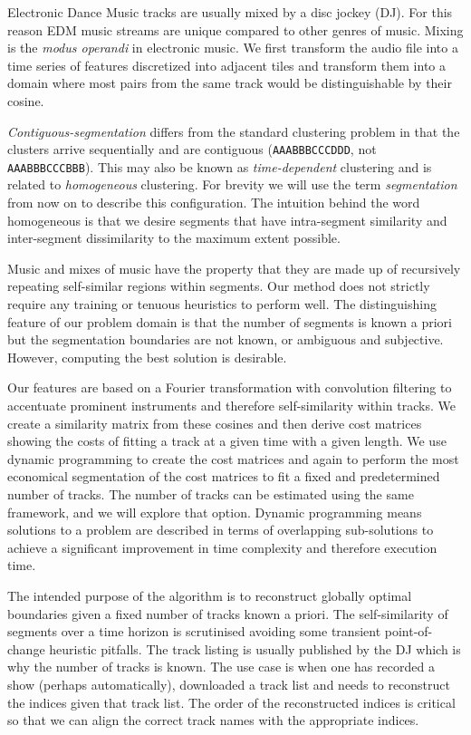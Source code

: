 \documentclass[twocolumn]{article}
\begin{document}
	Electronic Dance Music tracks are usually mixed by a disc jockey (DJ). For this reason EDM music streams are unique compared to other genres of music. Mixing is the \textit{modus operandi} in electronic music. We first transform the audio file into a time series of features discretized into adjacent tiles and transform them into a domain where most pairs from the same track would be distinguishable by their cosine. 
	
	\textit{Contiguous-segmentation} differs from the standard clustering problem in that the clusters arrive sequentially and are contiguous (\texttt{AAABBBCCCDDD}, not \texttt{AAABBBCCCBBB}). This may also be known as \textit{time-dependent} clustering and is related to \textit{homogeneous} clustering. For brevity we will use the term \textit{segmentation} from now on to describe this configuration. The intuition behind the word homogeneous is that we desire segments that have intra-segment similarity and inter-segment dissimilarity to the maximum extent possible. 
	
	Music and mixes of music have the property that they are made up of recursively repeating self-similar regions within segments. Our method does not strictly require any training or tenuous heuristics to perform well. The distinguishing feature of our problem domain is that the number of segments is known a priori but the segmentation boundaries are not known, or ambiguous and subjective. However, computing the best solution is desirable.
	
	Our features are based on a Fourier transformation with convolution filtering to accentuate prominent instruments and therefore self-similarity within tracks. We create a similarity matrix from these cosines and then derive cost matrices showing the costs of fitting a track at a given time with a given length. We use dynamic programming to create the cost matrices and again to perform the most economical segmentation of the cost matrices to fit a fixed and predetermined number of tracks. The number of tracks can be estimated using the same framework, and we will explore that option. Dynamic programming means solutions to a problem are described in terms of overlapping sub-solutions to achieve a significant improvement in time complexity and therefore execution time. 
	
	The intended purpose of the algorithm is to reconstruct globally optimal boundaries given a fixed number of tracks known a priori. The self-similarity of segments over a time horizon is scrutinised avoiding some transient point-of-change heuristic pitfalls. The track listing is usually published by the DJ which is why the number of tracks is known. The use case is when one has recorded a show (perhaps automatically), downloaded a track list and needs to reconstruct the indices given that track list. The order of the reconstructed indices is critical so that we can align the correct track names with the appropriate indices. 
	
\end{document}
